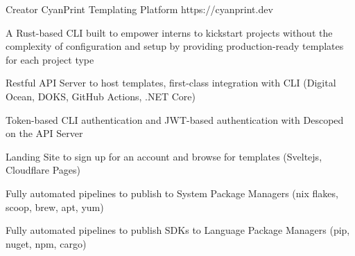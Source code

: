 

\begin{cventries}
    \cventry
    {Creator} %
    {CyanPrint} %
    {Templating Platform} %
    {https://cyanprint.dev} %
    {
    \begin{cvitems} %
        \item {A Rust-based CLI built to empower interns to kickstart projects without the complexity of configuration and setup by providing
        \newline production-ready templates for each project type}
        \item {Restful API Server to host templates, first-class integration with CLI \newline
        (Digital Ocean, DOKS, GitHub Actions, .NET Core)}
        \item {Token-based CLI authentication and JWT-based authentication with Descoped on the API Server}
        \item {Landing Site to sign up for an account and browse for templates (Sveltejs, Cloudflare Pages)}
        \item {Fully automated pipelines to publish to System Package Managers (nix flakes, scoop, brew, apt, yum)}
        \item {Fully automated pipelines to publish SDKs to Language Package Managers (pip, nuget, npm, cargo)}
    \end{cvitems}
    }

\end{cventries}
